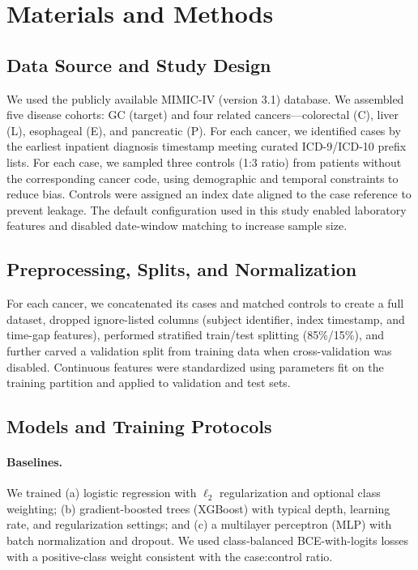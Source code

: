 \documentclass[journal,article,submit,pdftex,moreauthors]{Definitions/mdpi}
\begin{document}



\section{Materials and Methods}
\subsection{Data Source and Study Design}
We used the publicly available MIMIC-IV (version 3.1) database. We assembled five disease cohorts: GC (target) and four related cancers---colorectal (C), liver (L), esophageal (E), and pancreatic (P). For each cancer, we identified cases by the earliest inpatient diagnosis timestamp meeting curated ICD-9/ICD-10 prefix lists. For each case, we sampled three controls (1:3 ratio) from patients without the corresponding cancer code, using demographic and temporal constraints to reduce bias. Controls were assigned an index date aligned to the case reference to prevent leakage. The default configuration used in this study enabled laboratory features and disabled date-window matching to increase sample size.



\subsection{Preprocessing, Splits, and Normalization}
For each cancer, we concatenated its cases and matched controls to create a full dataset, dropped ignore-listed columns (subject identifier, index timestamp, and time-gap features), performed stratified train/test splitting (85\%/15\%), and further carved a validation split from training data when cross-validation was disabled. Continuous features were standardized using parameters fit on the training partition and applied to validation and test sets.


\subsection{Models and Training Protocols}
\paragraph{Baselines.} We trained (a) logistic regression with $\ell_2$ regularization and optional class weighting; (b) gradient-boosted trees (XGBoost) with typical depth, learning rate, and regularization settings; and (c) a multilayer perceptron (MLP) with batch normalization and dropout. We used class-balanced BCE-with-logits losses with a positive-class weight consistent with the case:control ratio.
\end{document}
